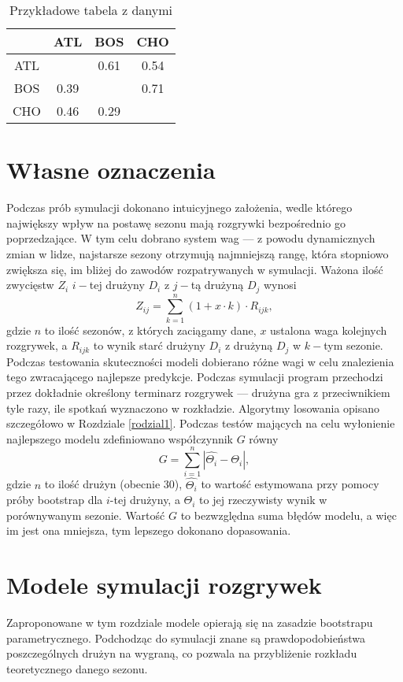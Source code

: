 \documentclass[inzynierska]{pwr_wmat_praca_dyplomowa}
\theoremstyle{plain}
\numberwithin{theorem}{chapter}
\theoremstyle{definition}
\numberwithin{theorem}{chapter}
\begin{document}
\begin{table}[]
	\centering
	\begin{tabular}{|c|c|c|c|}
		\hline
		&ATL & BOS & CHO\\ \hline
		ATL &  & 0.61&0.54\\ \hline
		BOS & 0.39 & &0.71\\ \hline
		CHO & 0.46 & 0.29&\\ \hline
	\end{tabular}
	\caption{Przykładowe tabela z danymi}\label{dane_tabela}	
\end{table}

\section{Własne oznaczenia} \label{wlasne_oznaczenia}
Podczas prób symulacji dokonano intuicyjnego założenia, wedle którego największy wpływ na postawę sezonu mają rozgrywki bezpośrednio go poprzedzające. W tym celu dobrano system wag --- z powodu dynamicznych zmian w lidze, najstarsze sezony otrzymują najmniejszą rangę, która stopniowo zwiększa się, im bliżej do zawodów rozpatrywanych w symulacji. Ważona ilość zwycięstw $Z_i$ $i-$tej drużyny $D_i$ z $j-$tą drużyną $D_j$ wynosi
\begin{equation}
	Z_{ij} = \sum_{k=1}^{n} (1+x\cdot k)\cdot R_{ijk}, 
\end{equation}
gdzie $n$ to ilość sezonów, z których zaciągamy dane, $x$ ustalona waga kolejnych rozgrywek, a $R_{ijk}$ to wynik starć drużyny $D_i$ z drużyną $D_j$ w $k-$tym sezonie. Podczas testowania skuteczności modeli dobierano różne wagi w celu znalezienia tego zwracającego najlepsze predykcje. Podczas symulacji program przechodzi przez dokładnie określony terminarz rozgrywek --- drużyna gra z przeciwnikiem tyle razy, ile spotkań wyznaczono w rozkładzie. Algorytmy losowania opisano szczegółowo w Rozdziale \ref{rodzial1}. 
Podczas testów mających na celu wyłonienie najlepszego modelu zdefiniowano współczynnik $G$ równy
\begin{equation}\label{wskaznik_g}
	G = \sum_{i=1}^{n}|\hat{\Theta_i} - \Theta_i|,
\end{equation}
gdzie $n$ to ilość drużyn (obecnie 30), $\hat{\Theta_i}$ to wartość estymowana przy pomocy próby bootstrap dla $i$-tej drużyny, a $\Theta_i$ to jej rzeczywisty wynik w porównywanym sezonie. Wartość $G$ to bezwzględna suma błędów modelu, a więc im jest ona mniejsza, tym lepszego dokonano dopasowania. 

\section{Modele symulacji rozgrywek}
Zaproponowane w tym rozdziale modele opierają się na zasadzie bootstrapu parametrycznego. Podchodząc do symulacji znane są prawdopodobieństwa poszczególnych drużyn na wygraną, co pozwala na przybliżenie rozkładu teoretycznego danego sezonu. 
\end{document}

